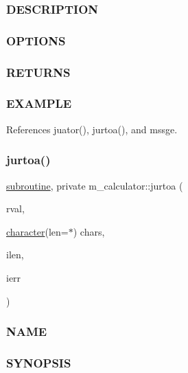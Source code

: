 \subsubsection*{D\+E\+S\+C\+R\+I\+P\+T\+I\+ON}

\subsubsection*{O\+P\+T\+I\+O\+NS}

\subsubsection*{R\+E\+T\+U\+R\+NS}

\subsubsection*{E\+X\+A\+M\+P\+LE}

References juator(), jurtoa(), and mssge.

\mbox{\label{namespacem__calculator_a5031622e3d493b738ac425f1fa454a60}} 
\subsubsection{\texorpdfstring{jurtoa()}{jurtoa()}}
{\footnotesize\ttfamily \hyperlink{M__stopwatch_83_8txt_acfbcff50169d691ff02d4a123ed70482}{subroutine}, private m\+\_\+calculator\+::jurtoa (\begin{DoxyParamCaption}\item[{}]{rval,  }\item[{\hyperlink{option__stopwatch_83_8txt_abd4b21fbbd175834027b5224bfe97e66}{character}(len=$\ast$)}]{chars,  }\item[{}]{ilen,  }\item[{}]{ierr }\end{DoxyParamCaption})\hspace{0.3cm}{\ttfamily [private]}}



\subsubsection*{N\+A\+ME}

\subsubsection*{S\+Y\+N\+O\+P\+S\+IS}

